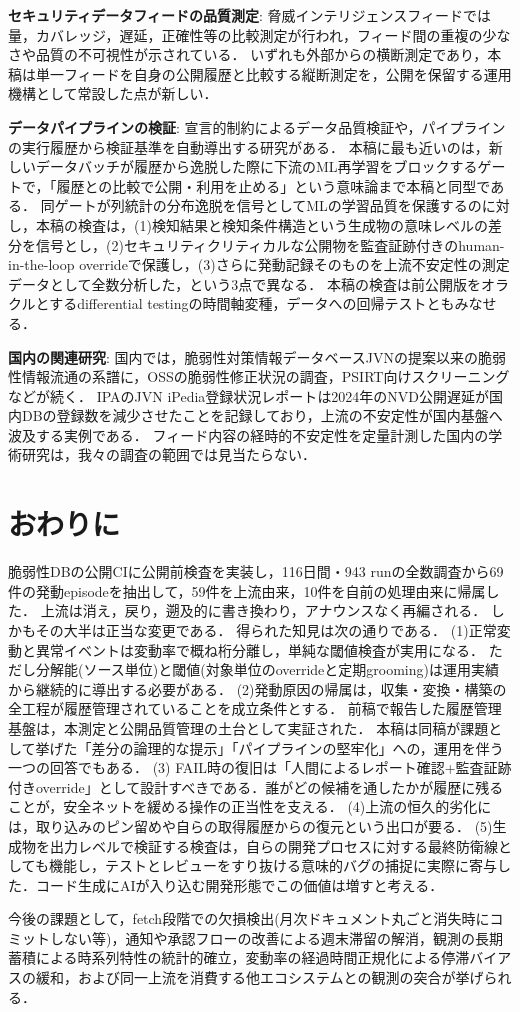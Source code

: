 \documentclass{css}
\begin{document}
\textbf{セキュリティデータフィードの品質測定}:
脅威インテリジェンスフィードでは量，カバレッジ，遅延，正確性等の比較測定が行われ，フィード間の重複の少なさや品質の不可視性が示されている\cite{li19,bouwman20,griffioen20}．
いずれも外部からの横断測定であり，本稿は単一フィードを自身の公開履歴と比較する縦断測定を，公開を保留する運用機構として常設した点が新しい．

\textbf{データパイプラインの検証}:
宣言的制約によるデータ品質検証\cite{schelter18,breck19}や，パイプラインの実行履歴から検証基準を自動導出する研究\cite{tu23,redyuk21}がある．
本稿に最も近いのは，新しいデータバッチが履歴から逸脱した際に下流のML再学習をブロックするゲート\cite{shankar23}で，「履歴との比較で公開・利用を止める」という意味論まで本稿と同型である．
同ゲートが列統計の分布逸脱を信号としてMLの学習品質を保護するのに対し，本稿の検査は，(1)検知結果と検知条件構造という生成物の意味レベルの差分を信号とし，(2)セキュリティクリティカルな公開物を監査証跡付きのhuman-in-the-loop overrideで保護し，(3)さらに発動記録そのものを上流不安定性の測定データとして全数分析した，という3点で異なる．
本稿の検査は前公開版をオラクルとするdifferential testing\cite{mckeeman98}の時間軸変種，データへの回帰テスト\cite{yoo12}ともみなせる．

\textbf{国内の関連研究}:
国内では，脆弱性対策情報データベースJVNの提案\cite{terada05}以来の脆弱性情報流通の系譜に，OSSの脆弱性修正状況の調査\cite{kuzuno24}，PSIRT向けスクリーニング\cite{kanai24}などが続く．
IPAのJVN iPedia登録状況レポート\cite{ipa-jvnipedia}は2024年のNVD公開遅延が国内DBの登録数を減少させたことを記録しており，上流の不安定性が国内基盤へ波及する実例である．
フィード内容の経時的不安定性を定量計測した国内の学術研究は，我々の調査の範囲では見当たらない．

\section{おわりに}
\label{sec:conclusion}

脆弱性DBの公開CIに公開前検査を実装し，116日間・943 runの全数調査から69件の発動episodeを抽出して，59件を上流由来，10件を自前の処理由来に帰属した．
上流は消え，戻り，遡及的に書き換わり，アナウンスなく再編される．
しかもその大半は正当な変更である．
得られた知見は次の通りである．
(1)正常変動と異常イベントは変動率で概ね桁分離し，単純な閾値検査が実用になる．
ただし分解能(ソース単位)と閾値(対象単位のoverrideと定期grooming)は運用実績から継続的に導出する必要がある．
(2)発動原因の帰属は，収集・変換・構築の全工程が履歴管理されていることを成立条件とする．
前稿で報告した履歴管理基盤\cite{nakaoka2025}は，本測定と公開品質管理の土台として実証された．
本稿は同稿が課題として挙げた「差分の論理的な提示」「パイプラインの堅牢化」への，運用を伴う一つの回答でもある．
(3) FAIL時の復旧は「人間によるレポート確認+監査証跡付きoverride」として設計すべきである．誰がどの候補を通したかが履歴に残ることが，安全ネットを緩める操作の正当性を支える．
(4)上流の恒久的劣化には，取り込みのピン留めや自らの取得履歴からの復元という出口が要る．
(5)生成物を出力レベルで検証する検査は，自らの開発プロセスに対する最終防衛線としても機能し，テストとレビューをすり抜ける意味的バグの捕捉に実際に寄与した．コード生成にAIが入り込む開発形態でこの価値は増すと考える．

今後の課題として，fetch段階での欠損検出(月次ドキュメント丸ごと消失時にコミットしない等)，通知や承認フローの改善による週末滞留の解消，観測の長期蓄積による時系列特性の統計的確立，変動率の経過時間正規化による停滞バイアスの緩和，および同一上流を消費する他エコシステムとの観測の突合が挙げられる．



\end{document}
